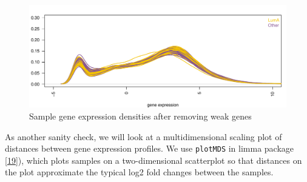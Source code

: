 \documentclass[
]{book}
\begin{document}
\begin{figure}
\centering
\includegraphics{Static/figures/brcaRna-preproc-densityGeneExpr2-1.pdf}
\caption{\label{fig:brcaRna-preproc-densityGeneExpr2}Sample gene expression densities after removing weak genes}
\end{figure}

As another sanity check, we will look at a
multidimensional scaling plot of distances between gene expression
profiles. We use \texttt{plotMDS} in limma package {[}\protect\hyperlink{ref-Ritchie:2015aa}{19}{]}),
which plots samples on a two-dimensional scatterplot so that distances on
the plot approximate the typical log2 fold changes between the
samples.
\end{document}
